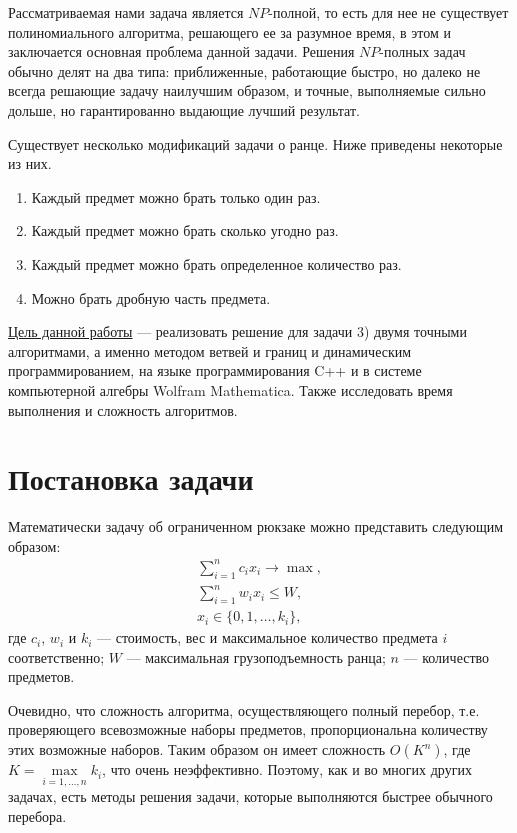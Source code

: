 \documentclass[12pt, a4paper]{article}
\begin{document}
	\medskip
	
	Рассматриваемая нами задача является $N\!P$-полной, то есть для нее не существует полиномиального алгоритма, решающего ее за разумное время, в этом и заключается основная проблема данной задачи. Решения $N\!P$-полных задач обычно делят на два типа: приближенные, работающие быстро, но далеко не всегда решающие задачу наилучшим образом, и точные, выполняемые сильно дольше, но гарантированно выдающие лучший результат.
	
	Существует несколько модификаций задачи о ранце. Ниже приведены некоторые из них.
	\begin{enumerate}
		\item Каждый предмет можно брать только один раз.
		\item Каждый предмет можно брать сколько угодно раз.
		\item Каждый предмет можно брать определенное количество раз.
		\item Можно брать дробную часть предмета.
	\end{enumerate}
	
	\medskip
	\underline{Цель данной работы} --- реализовать решение для задачи 3) двумя точными алгоритмами, а именно методом ветвей и границ и динамическим программирова\-нием, на языке программирования C++ и в системе компьютерной алгебры Wolfram Mathematica. Также исследовать время выполнения и сложность алгоритмов.
	
	\section{Постановка задачи}
	
	Математически задачу об ограниченном рюкзаке можно представить следующим образом:
	\begin{equation}
		\label{problem}
		\begin{gathered}
			\sum_{i=1}^{n} c_i x_i \rightarrow \max, \\
			\sum_{i=1}^{n} w_i x_i \le W, \\
			x_i \in \{0,1,\dots,k_i\},
		\end{gathered}
	\end{equation}
	где $c_i$, $w_i$ и $k_i$ --- стоимость, вес и максимальное количество предмета $i$ соответственно; $W$ --- максимальная грузоподъемность ранца; $n$ --- количество предметов.
	
	Очевидно, что сложность алгоритма, осуществляющего полный перебор, т.е. проверяющего всевозможные наборы предметов, пропорциональна количеству этих возможные наборов. Таким образом он имеет сложность $O(K^n)$, где $K = \max\limits_{i=1,\dots,n} k_i$, что очень неэффективно. Поэтому, как и во многих других задачах, есть методы решения задачи, которые выполняются быстрее обычного перебора.
	
\end{document}
